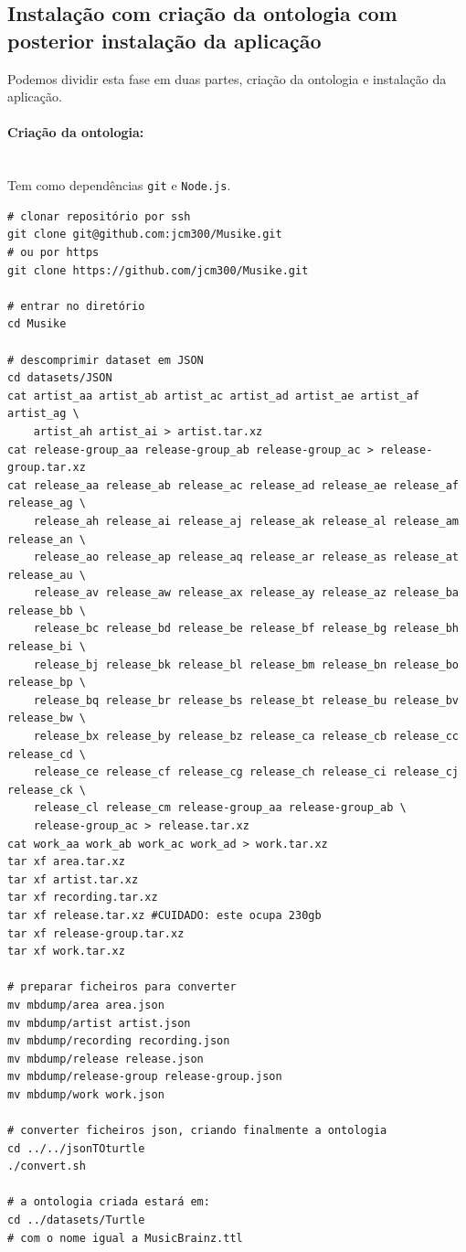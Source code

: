 \documentclass{article}
\begin{document}
\subsection{Instalação com criação da ontologia com posterior instalação da aplicação}

Podemos dividir esta fase em duas partes, criação da ontologia e instalação da aplicação.

\paragraph{Criação da ontologia:}\mbox{}\\

Tem como dependências \texttt{git} e \texttt{Node.js}.

\begin{framed}
\begin{verbatim}
# clonar repositório por ssh
git clone git@github.com:jcm300/Musike.git
# ou por https
git clone https://github.com/jcm300/Musike.git

# entrar no diretório
cd Musike

# descomprimir dataset em JSON
cd datasets/JSON
cat artist_aa artist_ab artist_ac artist_ad artist_ae artist_af artist_ag \ 
    artist_ah artist_ai > artist.tar.xz
cat release-group_aa release-group_ab release-group_ac > release-group.tar.xz
cat release_aa release_ab release_ac release_ad release_ae release_af release_ag \ 
    release_ah release_ai release_aj release_ak release_al release_am release_an \
    release_ao release_ap release_aq release_ar release_as release_at release_au \
    release_av release_aw release_ax release_ay release_az release_ba release_bb \
    release_bc release_bd release_be release_bf release_bg release_bh release_bi \
    release_bj release_bk release_bl release_bm release_bn release_bo release_bp \
    release_bq release_br release_bs release_bt release_bu release_bv release_bw \
    release_bx release_by release_bz release_ca release_cb release_cc release_cd \
    release_ce release_cf release_cg release_ch release_ci release_cj release_ck \
    release_cl release_cm release-group_aa release-group_ab \
    release-group_ac > release.tar.xz
cat work_aa work_ab work_ac work_ad > work.tar.xz
tar xf area.tar.xz
tar xf artist.tar.xz
tar xf recording.tar.xz
tar xf release.tar.xz #CUIDADO: este ocupa 230gb
tar xf release-group.tar.xz
tar xf work.tar.xz

# preparar ficheiros para converter
mv mbdump/area area.json
mv mbdump/artist artist.json
mv mbdump/recording recording.json
mv mbdump/release release.json
mv mbdump/release-group release-group.json
mv mbdump/work work.json

# converter ficheiros json, criando finalmente a ontologia
cd ../../jsonTOturtle
./convert.sh

# a ontologia criada estará em:
cd ../datasets/Turtle
# com o nome igual a MusicBrainz.ttl 
\end{verbatim}
\end{framed}
\end{document}
